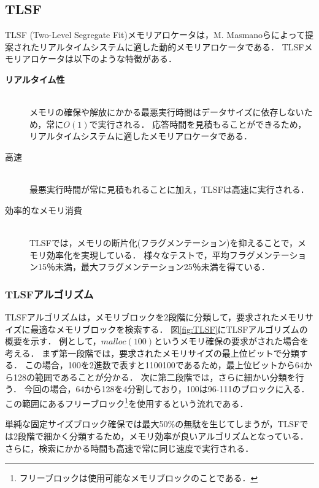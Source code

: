 \documentclass[submit,techrep]{ipsj_v2/UTF8/ipsj}
\begin{document}
\subsection{TLSF}
\label{sec:TLSF}
TLSF (Two-Level Segregate Fit)メモリアロケータ\cite{par:TLSF}\cite{url:TLSF}は，M. Masmanoらによって提案されたリアルタイムシステムに適した動的メモリアロケータである．
TLSFメモリアロケータは以下のような特徴がある．
\begin{description}
    \item[{\bf リアルタイム性}]\mbox{}\\
        メモリの確保や解放にかかる最悪実行時間はデータサイズに依存しないため，常に$O(1)$で実行される．
        応答時間を見積もることができるため，リアルタイムシステムに適したメモリアロケータである．
    \item[{高速}]\mbox{}\\
        最悪実行時間が常に見積もれることに加え，TLSFは高速に実行される．
    \item[{効率的なメモリ消費}]\mbox{}\\
        TLSFでは，メモリの断片化(フラグメンテーション)を抑えることで，メモリ効率化を実現している．
        様々なテストで，平均フラグメンテーション15％未満，最大フラグメンテーション25％未満を得ている．
\end{description}


\subsubsection{TLSFアルゴリズム}

TLSFアルゴリズムは，メモリブロックを2段階に分類して，要求されたメモリサイズに最適なメモリブロックを検索する．
図\ref{fig:TLSF}にTLSFアルゴリズムの概要を示す．
例として，$malloc(100)$というメモリ確保の要求がされた場合を考える．
まず第一段階では，要求されたメモリサイズの最上位ビットで分類する．
この場合，100を2進数で表すと1100100であるため，最上位ビットから64から128の範囲であることが分かる．
次に第二段階では，さらに細かい分類を行う．
今回の場合，64から128を4分割しており，100は96-111のブロックに入る．
この範囲にあるフリーブロック\footnote{フリーブロックは使用可能なメモリブロックのことである．}を使用するという流れである．

単純な固定サイズブロック確保では最大50\%の無駄を生じてしまうが，TLSFでは2段階で細かく分類するため，メモリ効率が良いアルゴリズムとなっている．
さらに，検索にかかる時間も高速で常に同じ速度で実行される．
\end{document}
